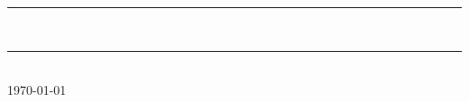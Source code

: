 \documentclass[a4paper,12pt]{article}\usepackage[]{graphicx}\usepackage[]{color}
\begin{document}
\sectionfont{\color{darkpink}} 
\chapterfont{\color{darkpink}} 
\renewcommand{\headrulewidth}{.4mm}
\renewcommand{\headrule}{\hbox to\headwidth{%
  \color{darkpink}\leaders\hrule height \headrulewidth\hfill}}
\fancyhead{}
\fancyfoot{}
\rfoot{\thepage}
\begin{titlepage}
\thispagestyle{plain}
\center
\vspace*{1cm}
\textcolor{darkpink}{\rule{\linewidth}{0.75mm}}\\[1cm]
\textcolor{darkpink}{\rule{\linewidth}{0.75mm}}\\[4cm]

{\Large \today}\\[2cm] 
\vfill %
\end{titlepage}
\newpage
\end{document}
